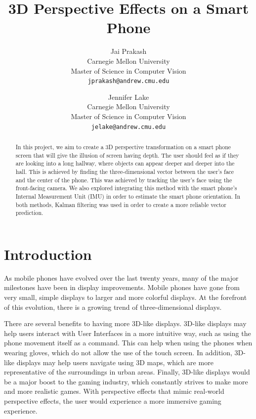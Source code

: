 \documentclass[12pt,twocolumn,letterpaper]{article}
\begin{document}
\title{3D Perspective Effects on a Smart Phone}

\author{Jai Prakash\\
Carnegie Mellon University\\
Master of Science in Computer Vision\\
{\tt\small jprakash@andrew.cmu.edu}
\and
Jennifer Lake\\
Carnegie Mellon University\\
Master of Science in Computer Vision\\
{\tt\small jelake@andrew.cmu.edu}
}

\maketitle

\begin{abstract}
In this project, we aim to create a 3D perspective transformation on a smart phone screen that will give the illusion of screen having depth.  The user should feel as if they are looking into a long hallway, where objects can appear deeper and deeper into the hall. This is achieved by finding the three-dimensional vector between the user’s face and the center of the phone.  This was achieved by tracking the user’s face using the front-facing camera.  We also explored integrating this method with the smart phone's Internal Measurement Unit (IMU) in order to estimate the smart phone orientation. In both methods, Kalman filtering was used in order to create a more reliable vector prediction.
\end{abstract}

\section{Introduction}
As mobile phones have evolved over the last twenty years, many of the major milestones have been in display improvements. Mobile phones have gone from very small, simple displays to larger and more colorful displays.  At the forefront of this evolution, there is a growing trend of three-dimensional displays. 

There are several benefits to having more 3D-like displays.  3D-like displays may help users interact with User Interfaces in a more intuitive way, such as using the phone movement itself as a command.  This can help when using the phones when wearing gloves, which do not allow the use of the touch screen.  In addition, 3D-like displays may help users navigate using 3D maps, which are more representative of the surroundings in urban areas. Finally, 3D-like displays would be a major boost to the gaming industry, which constantly strives to make more and more realistic games.  With perspective effects that mimic real-world perspective effects, the user would experience a more immersive gaming experience.
\end{document}
